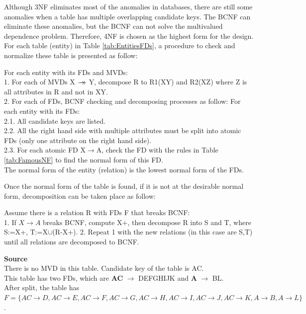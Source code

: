 Although 3NF eliminates most of the anomalies in databases, there are still some anomalies when a table has multiple overlapping candidate keys. The BCNF can eliminate these anomalies, but the BCNF can not solve the multivalued dependence problem. Therefore, 4NF is chosen as the highest form for the design. For each table (entity) in Table \ref{tab:EntitiesFDs}, a procedure to check and normalize these table is presented as follow\citep{INF3100_Recipe_book}:
\begin{adjustwidth}{1cm}{}
For each entity with its FDs and MVDs:\\
1. For each of MVDs X $\rightarrow\mathrel{\mkern-14mu}\rightarrow$ Y, decompose R to R1(XY) and R2(XZ) where Z is all attributes in R and not in XY.\\
2. For each of FDs, BCNF checking and decomposing processes as follow\citep{INF3100_Recipe_book}:
For each entity with its FDs:\\
2.1. All candidate keys are listed.\\
2.2. All the right hand side with multiple attributes must be split into atomic FDs (only one attribute on the right hand side).\\
2.3. For each atomic FD X$\rightarrow$A, check the FD with the rules in Table \ref{tab:FamousNF} to find the normal form of this FD.\\
The normal form of the entity (relation) is the lowest normal form of the FDs.
\end{adjustwidth}
Once the normal form of the table is found, if it is not at the desirable normal form, decomposition can be taken place as follow\citep{INF3100_Recipe_book}:
\begin{adjustwidth}{1cm}{}
Assume there is a relation R with FDs F that breaks BCNF:\\
1. If $X \rightarrow A$ breaks BCNF, compute X+, then decompose R into S and T, where S:=X+, T:=X$\cup$(R-X+).
2. Repeat 1 with the new relations (in this case are S,T) until all relations are decomposed to BCNF.
\end{adjustwidth}
\textbf{Source}\\
There is no MVD in this table. Candidate key of the table is AC.\\
This table has two FDs, which are \textbf{AC} $\rightarrow$ DEFGHIJK and \textbf{A} $\rightarrow$ BL.\\
After split, the table has $F=\{AC \rightarrow D, AC \rightarrow E, AC \rightarrow F, AC \rightarrow G, AC \rightarrow H, AC \rightarrow I, AC \rightarrow J, AC \rightarrow K, A \rightarrow B, A \rightarrow L\}$.
